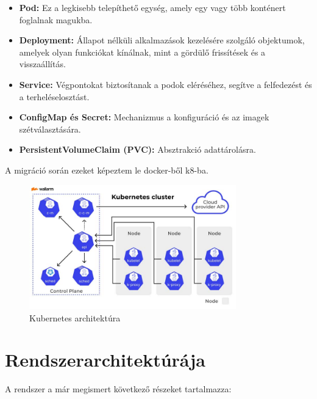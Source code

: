 \begin{itemize}
    \item \textbf{Pod:} Ez a legkisebb telepíthető egység, amely egy vagy több konténert foglalnak magukba.
    
    \item \textbf{Deployment:} Állapot nélküli alkalmazások kezelésére szolgáló objektumok, amelyek olyan funkciókat kínálnak, mint a gördülő frissítések és a visszaállítás.
    
    \item \textbf{Service:} Végpontokat biztosítanak a podok eléréséhez, segítve a felfedezést és a terheléselosztást.
    
    \item \textbf{ConfigMap és Secret:} Mechanizmus a konfiguráció és az imagek szétválasztására.
    
    \item \textbf{PersistentVolumeClaim (PVC):} Absztrakció adattárolásra.
\end{itemize}

A migráció során ezeket képeztem le docker-ből k8-ba.

\begin{figure}[!ht]
    \centering
    \includegraphics[width=0.8\textwidth, keepaspectratio]{figures/components-of-kubernetes.jpeg}
    \caption{Kubernetes architektúra \cite{wallarm_kubernetes_cluster}} 
\end{figure}

\section{Rendszerarchitektúrája}

A rendszer a már megismert következő részeket tartalmazza:

